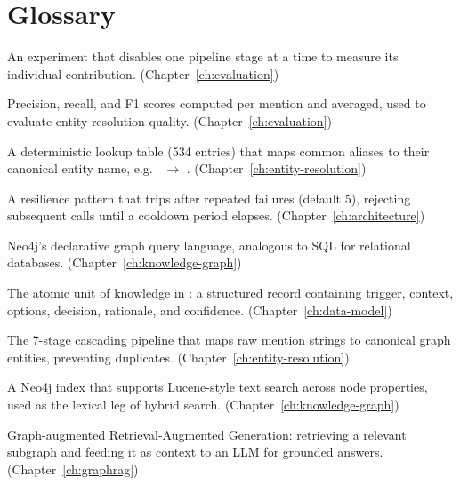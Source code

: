 \chapter{Glossary}
\label{ch:glossary}

\begin{description}[style=nextline, leftmargin=2em]

\item[Ablation study]
  An experiment that disables one pipeline stage at a time to measure its
  individual contribution.
  (Chapter~\ref{ch:evaluation})

\item[B-cubed metrics]
  Precision, recall, and F1 scores computed per mention and averaged,
  used to evaluate entity-resolution quality.
  (Chapter~\ref{ch:evaluation})

\item[Canonical mapping]
  A deterministic lookup table (534 entries) that maps common aliases to
  their canonical entity name, e.g.\  $\to$ .
  (Chapter~\ref{ch:entity-resolution})

\item[Circuit breaker]
  A resilience pattern that trips after repeated failures (default 5),
  rejecting subsequent calls until a cooldown period elapses.
  (Chapter~\ref{ch:architecture})

\item[Cypher]
  Neo4j's declarative graph query language, analogous to SQL for
  relational databases.
  (Chapter~\ref{ch:knowledge-graph})

\item[Decision trace]
  The atomic unit of knowledge in \sysname{}: a structured record
  containing trigger, context, options, decision, rationale, and
  confidence.
  (Chapter~\ref{ch:data-model})

\item[Entity resolution]
  The 7-stage cascading pipeline that maps raw mention strings to
  canonical graph entities, preventing duplicates.
  (Chapter~\ref{ch:entity-resolution})

\item[Fulltext index]
  A Neo4j index that supports Lucene-style text search across node
  properties, used as the lexical leg of hybrid search.
  (Chapter~\ref{ch:knowledge-graph})

\item[GraphRAG]
  Graph-augmented Retrieval-Augmented Generation: retrieving a relevant
  subgraph and feeding it as context to an LLM for grounded answers.
  (Chapter~\ref{ch:graphrag})


\end{description}
